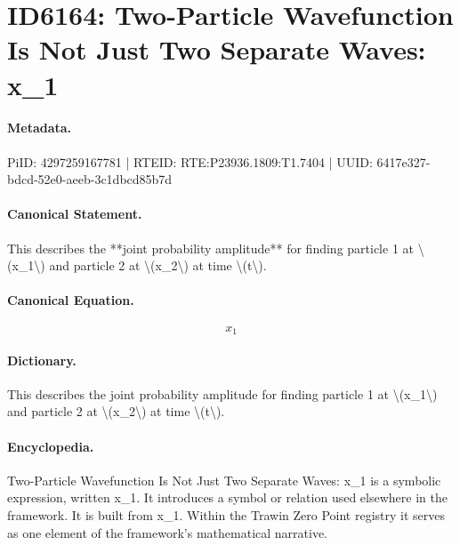 \section*{ID6164: Two-Particle Wavefunction Is Not Just Two Separate Waves: x\_1}
\paragraph{Metadata.}
PiID: 4297259167781 | RTEID: RTE:P23936.1809:T1.7404 | UUID: 6417e327-bdcd-52e0-aeeb-3c1dbcd85b7d

\paragraph{Canonical Statement.}
This describes the **joint probability amplitude** for finding particle 1 at \textbackslash{}(x\_1\textbackslash{}) and particle 2 at \textbackslash{}(x\_2\textbackslash{}) at time \textbackslash{}(t\textbackslash{}).

\paragraph{Canonical Equation.}
\[
x_1
\]

\paragraph{Dictionary.}
This describes the joint probability amplitude for finding particle 1 at \textbackslash{}(x\_1\textbackslash{}) and particle 2 at \textbackslash{}(x\_2\textbackslash{}) at time \textbackslash{}(t\textbackslash{}).

\paragraph{Encyclopedia.}
Two-Particle Wavefunction Is Not Just Two Separate Waves: x\_1 is a symbolic expression, written x\_1. It introduces a symbol or relation used elsewhere in the framework. It is built from x\_1. Within the Trawin Zero Point registry it serves as one element of the framework's mathematical narrative.
